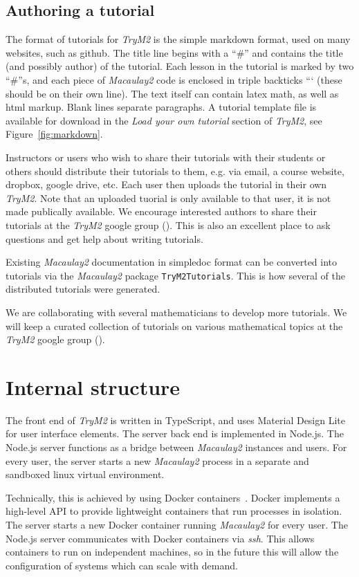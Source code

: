 \documentclass[twocolumn]{article}
\def\trym2{{\it TryM2}}
\def\M2{{\it Macaulay2}}
\begin{document}
\subsection{Authoring a tutorial}

The format of tutorials for \trym2 is the simple markdown format, used
on many websites, such as github. The title line begins with a ``\#''
and contains the title (and possibly author) of the tutorial. Each lesson
in the tutorial is marked by two ``\#''s, and each piece of \M2 code is enclosed in triple
backticks ``` (these should be on their own line).  The text itself
can contain latex math, as well as html markup.  Blank lines separate
paragraphs. A tutorial template file is available for download in the
{\it Load your own tutorial} section of \trym2, see
Figure~\ref{fig:markdown}.

Instructors or users who wish to share their tutorials with their
students or others should distribute their tutorials to them, e.g. via
email, a course website, dropbox, google drive, etc.  Each
user then uploads the tutorial in their own \trym2.  Note that an
uploaded tuorial is only available to that user, it is not made
publically available.  We encourage interested authors to share their
tutorials at the \trym2 google group (\cite{trym2:googlegroup}).  This
is also an excellent place to ask questions and get help about writing
tutorials.

Existing \M2 documentation in simpledoc format can be converted into
tutorials via the \M2 package {\tt TryM2Tutorials}.  This is how several of
the distributed tutorials were generated.

We are collaborating with several mathematicians to develop more
tutorials.  We will keep a curated collection of tutorials on various
mathematical topics at the \trym2 google group (\cite{trym2:googlegroup}).
 
\section{Internal structure}

The front end of \trym2 is written in TypeScript, and uses Material Design Lite
\cite{MDL} for user interface elements.  The server back end is
implemented in Node.js. The Node.js server functions as a bridge
between \M2 instances and users.  For every user, the server starts
a new \M2 process in a separate and sandboxed linux virtual environment.

Technically, this is achieved by using Docker
containers~\cite{docker}. Docker implements a high-level API to
provide lightweight containers that run processes in isolation.  The
server starts a new Docker container running \M2 for every user. The
Node.js server communicates with Docker containers via {\it ssh}. This
allows containers to run on independent machines, so in the future
this will allow the configuration of systems which can scale with
demand.
\end{document}
